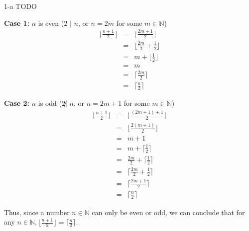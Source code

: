 \documentclass[11pt]{article}
\begin{document}
\begin{prob}{1-a}
TODO
\end{prob}
\begin{sol}

\textbf{Case 1:} $n$ is even ($2$ $|$ $n$, or $n = 2m$ for some $m \in \mathbb{N}$) 
\begin{eqnarray*}
\lfloor\frac{n+1}{2}\rfloor & = & \lfloor\frac{2m + 1}{2}\rfloor \\
& = & \lfloor\frac{2m}{2}  + \frac{1}{2}\rfloor\\
& = & m + \lfloor\frac{1}{2}\rfloor \\
& = & m \\
& = & \lceil\frac{2m}{2}\rceil \\
& = & \lceil\frac{n}{2}\rceil
\end{eqnarray*}

\textbf{Case 2:} $n$ is odd ($2 \not|$  $n$, or $n = 2m + 1$ for some $m \in \mathbb{N}$) 
\begin{eqnarray*}
\lfloor\frac{n+1}{2}\rfloor & = & \lfloor\frac{(2m + 1) +1}{2}\rfloor \\
& = & \lfloor\frac{2(m + 1)}{2}\rfloor \\
& = & m + 1 \\
& = & m + \lceil\frac{1}{2}\rceil \\
& = & \frac{2m}{2} + \lceil\frac{1}{2}\rceil \\
& = & \lceil\frac{2m}{2} + \frac{1}{2}\rceil \\
& = & \lceil\frac{2m + 1}{2}\rceil  \\
& = & \lceil\frac{n}{2}\rceil
\end{eqnarray*}

Thus, since a number $n \in \mathbb{N}$ can only be even or odd, we can conclude that for any $n \in \mathbb{N}, \lfloor\frac{n+1}{2}\rfloor = \lceil\frac{n}{2}\rceil$.
\end{sol}
\end{document}
